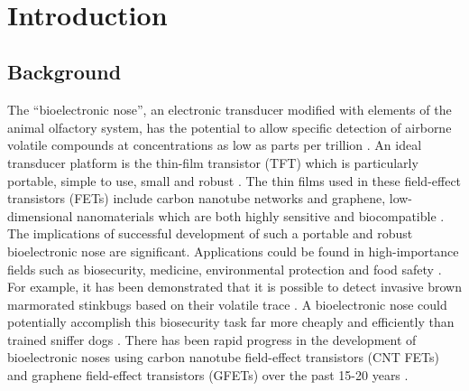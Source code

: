 \documentclass[
  a4paper,
]{scrbook}
\begin{document}
\clearpage
\newpage
\thispagestyle{empty} %
\mbox{~}
\clearpage
\newpage

\makeatletter
\setlength{\@fptop}{0pt plus 1fil}
\setlength{\@fpbot}{0pt plus 1fil}
\makeatother

\pagestyle{headings}
\mainmatter
{}

\hypertarget{introduction}{%
\chapter{Introduction}\label{introduction}}

\hypertarget{background}{%
\section{Background}\label{background}}

The ``bioelectronic nose'', an electronic transducer modified with
elements of the animal olfactory system, has the potential to allow
specific detection of airborne volatile compounds at concentrations as
low as parts per trillion
\autocite{Glatz2011,Kwon2015,Dung2018,Kim2022a}. An ideal transducer
platform is the thin-film transistor (TFT) which is particularly
portable, simple to use, small and robust
\autocite{Kauffman2008,Khan2020}. The thin films used in these
field-effect transistors (FETs) include carbon nanotube networks and
graphene, low-dimensional nanomaterials which are both highly sensitive
and biocompatible \autocite{Shkodra2021}. The implications of successful
development of such a portable and robust bioelectronic nose are
significant. Applications could be found in high-importance fields such
as biosecurity, medicine, environmental protection and food safety
\autocite{Dung2018,Arakawa2019,Yang2017,Son2017}. For example, it has
been demonstrated that it is possible to detect invasive brown
marmorated stinkbugs based on their volatile trace \autocite{Moser2020}.
A bioelectronic nose could potentially accomplish this biosecurity task
far more cheaply and efficiently than trained sniffer dogs
\autocite{Lee2010,Moon2020,Terutsuki2020}. There has been rapid progress
in the development of bioelectronic noses using carbon nanotube
field-effect transistors (CNT FETs) and graphene field-effect
transistors (GFETs) over the past 15-20 years
\autocite{Yoon2009,Lee2010,Yang2018}.
\end{document}
